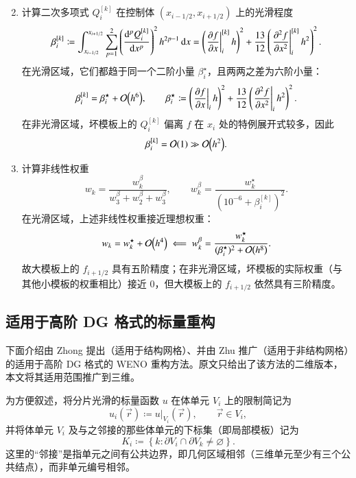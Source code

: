 \begin{enumerate}[wide]
\begin{equation}
\end{equation}
\item 计算二次多项式 $Q_{i}^{[k]}$ 在控制体 $(x_{i-1/2},x_{i+1/2})$ 上的光滑程度
\begin{equation}
\beta_{i}^{[k]}\coloneqq\int_{x_{i-1/2}}^{x_{i+1/2}}\sum_{p=1}^{2}\left(\dv[p]{Q_{i}^{[k]}}{x}\right)^{2}h^{2p-1}\dd{x}=\left(\eval{\pdv{f}{x}}_{i}^{[k]}h\right)^{2}+\frac{13}{12}\left(\eval{\pdv[2]{f}{x}}_{i}^{[k]}h^{2}\right)^{2}.
\end{equation}
在光滑区域，它们都趋于同一个二阶小量 $\beta_{i}^{\star}$，且两两之差为六阶小量：
\begin{equation}
\beta_{i}^{[k]}=\beta_{i}^{\star}+\order{h^{6}},\qquad\beta_{i}^{\star}\coloneqq\left(\eval{\pdv{f}{x}}_{i}h\right)^{2}+\frac{13}{12}\left(\eval{\pdv[2]{f}{x}}_{i}h^{2}\right)^{2}.
\end{equation}
在非光滑区域，坏模板上的 $Q_{i}^{[k]}$ 偏离 $f$ 在 $x_{i}$ 处的特例展开式较多，因此
\begin{equation}
\beta_{i}^{[k]}=\order{1}\gg\order{h^{2}}.
\end{equation}
\item 计算非线性权重
\begin{equation}
w_{k}=\frac{w_{k}^{\beta}}{w_{3}^{\beta}+w_{2}^{\beta}+w_{3}^{\beta}},\qquad w_{k}^{\beta}=\frac{w_{k}^{\star}}{\left(10^{-6}+\beta_{i}^{[k]}\right)^{2}}.
\end{equation}
在光滑区域，上述非线性权重接近理想权重：
\begin{equation}
w_{k}=w_{k}^{\star}+\order{h^{4}}\impliedby w_{k}^{\beta}=\frac{w_{k}^{\star}}{(\beta_{i}^{\star})^{2}+\order{h^{8}}}.
\end{equation}
故大模板上的 $f_{i+1/2}$ 具有五阶精度；在非光滑区域，坏模板的实际权重（与其他小模板的权重相比）接近 $0$，但大模板上的
$f_{i+1/2}$ 依然具有三阶精度。
\end{enumerate}


\subsection{适用于高阶 DG 格式的标量重构}

下面介绍由 Zhong 提出（适用于结构网格）、并由 Zhu
推广（适用于非结构网格）的适用于高阶 DG 格式的 WENO 重构方法。原文只给出了该方法的二维版本，本文将其适用范围推广到三维。

为方便叙述，将分片光滑的标量函数 $u$ 在体单元 $V_{i}$ 上的限制简记为
\begin{equation}
u_{i}(\vec{r})\coloneqq u\vert_{V_{i}}(\vec{r}),\qquad\vec{r}\in V_{i},
\end{equation}
并将体单元 $V_{i}$ 及与之邻接的那些体单元的下标集（即局部模板）记为
\begin{equation}
K_{i}\coloneqq\left\{ k:\partial V_{i}\cap\partial V_{k}\ne\varnothing\right\} .
\end{equation}
这里的“邻接”是指单元之间有公共边界，即几何区域相邻（三维单元至少有三个公共结点），而非单元编号相邻。

